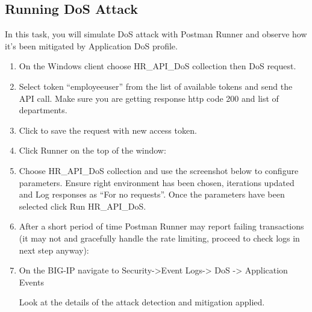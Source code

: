 \documentclass[letterpaper,10pt,english]{sphinxmanual}
\begin{document}
\subsection{Running DoS Attack}
\label{\detokenize{class1/module4/module4:running-dos-attack}}
In this task, you will simulate DoS attack with Postman Runner and
observe how it’s been mitigated by Application DoS profile.
\begin{enumerate}
\item {} 
On the Windows client choose HR\_API\_DoS collection then DoS
request.

\item {} 
Select token “employeeuser” from the list of available tokens and send the API call. Make sure you are getting response http code 200 and list of departments.

\item {} 
Click  to save the request with new access token.

\item {} 
Click Runner on the top of the window:

\end{enumerate}
\begin{quote}

\noindent{}
\end{quote}
\begin{enumerate}
\setcounter{enumi}{4}
\item {} 
Choose HR\_API\_DoS collection and use the screenshot below to configure parameters. Ensure right environment has been chosen, iterations updated and Log responses as “For no requests”. Once the parameters have been selected click Run HR\_API\_DoS.

\end{enumerate}
\begin{quote}

\noindent{}
\end{quote}
\begin{enumerate}
\setcounter{enumi}{5}
\item {} 
After a short period of time Postman Runner may report failing
transactions (it may not and gracefully handle the rate limiting,
proceed to check logs in next step anyway):

\end{enumerate}
\begin{quote}

\noindent{}
\end{quote}
\begin{enumerate}
\setcounter{enumi}{6}
\item {} 
On the BIG-IP navigate to Security-\textgreater{}Event Logs-\textgreater{} DoS -\textgreater{} Application
Events

Look at the details of the attack detection and mitigation
applied.

\end{enumerate}
\begin{quote}

\noindent{}
\end{quote}
\end{document}
